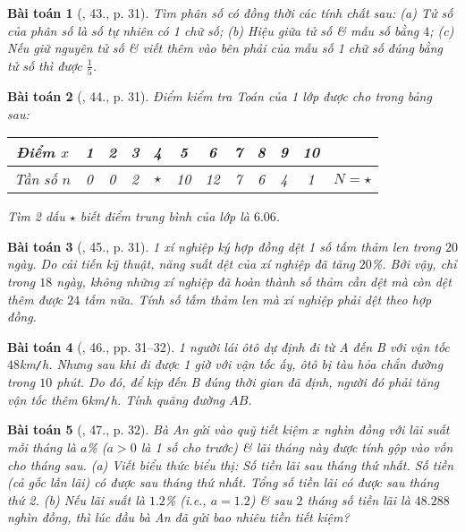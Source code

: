 \documentclass{article}
\newtheorem{baitoan}{Bài toán}
\begin{document}
\begin{baitoan}[\cite{SGK_Toan_8_tap_2}, 43., p. 31]
	Tìm phân số có đồng thời các tính chất sau: (a) Tử số của phân số là số tự nhiên có 1 chữ số; (b) Hiệu giữa tử số \& mẫu số bằng $4$; (c) Nếu giữ nguyên tử số \& viết thêm vào bên phải của mẫu số 1 chữ số đúng bằng tử số thì được $\frac{1}{5}$.
\end{baitoan}

\begin{baitoan}[\cite{SGK_Toan_8_tap_2}, 44., p. 31]
	Điểm kiểm tra Toán của 1 lớp được cho trong bảng sau:
	\begin{table}[H]
		\centering
		\begin{tabular}{|c|c|c|c|c|c|c|c|c|c|c|c|}
			\hline
			Điểm $x$ & 1 & 2 & 3 & 4 & 5 & 6 & 7 & 8 & 9 & 10 &  \\
			\hline
			Tần số $n$ & 0 & 0 & 2 & $\star$ & 10 & 12 & 7 & 6 & 4 & 1 & $N = \star$ \\
			\hline
		\end{tabular}
	\end{table}
	Tìm 2 dấu $\star$ biết điểm trung bình của lớp là $6.06$.
\end{baitoan}

\begin{baitoan}[\cite{SGK_Toan_8_tap_2}, 45., p. 31]
	1 xí nghiệp ký hợp đồng dệt 1 số tấm thảm len trong $20$ ngày. Do cải tiến kỹ thuật, năng suất dệt của xí nghiệp đã tăng $20$\%. Bởi vậy, chỉ trong $18$ ngày, không những xí nghiệp đã hoàn thành số thảm cần dệt mà còn dệt thêm được $24$ tấm nữa. Tính số tấm thảm len mà xí nghiệp phải dệt theo hợp đồng.
\end{baitoan}

\begin{baitoan}[\cite{SGK_Toan_8_tap_2}, 46., pp. 31--32]
	1 người lái ôtô dự định đi từ A đến B với vận tốc $48$\emph{km\texttt{/}h}. Nhưng sau khi đi được 1 giờ với vận tốc ấy, ôtô bị tàu hỏa chắn đường trong $10$ phút. Do đó, để kịp đến B đúng thời gian đã định, người đó phải tăng vận tốc thêm $6$\emph{km\texttt{/}h}. Tính quãng đường $AB$.
\end{baitoan}

\begin{baitoan}[\cite{SGK_Toan_8_tap_2}, 47., p. 32]
	Bà An gửi vào quỹ tiết kiệm $x$ nghìn đồng với lãi suất mỗi tháng là $a$\% ($a > 0$ là 1 số cho trước) \& lãi tháng này được tính gộp vào vốn cho tháng sau. (a) Viết biểu thức biểu thị: Số tiền lãi sau tháng thứ nhất. Số tiền (cả gốc lẫn lãi) có được sau tháng thứ nhất. Tổng số tiền lãi có được sau tháng thứ 2. (b) Nếu lãi suất là $1.2$\% (i.e., $a = 1.2$) \& sau $2$ tháng số tiền lãi là $48.288$ nghìn đồng, thì lúc đầu bà An đã gửi bao nhiêu tiền tiết kiệm?
\end{baitoan}
\end{document}
